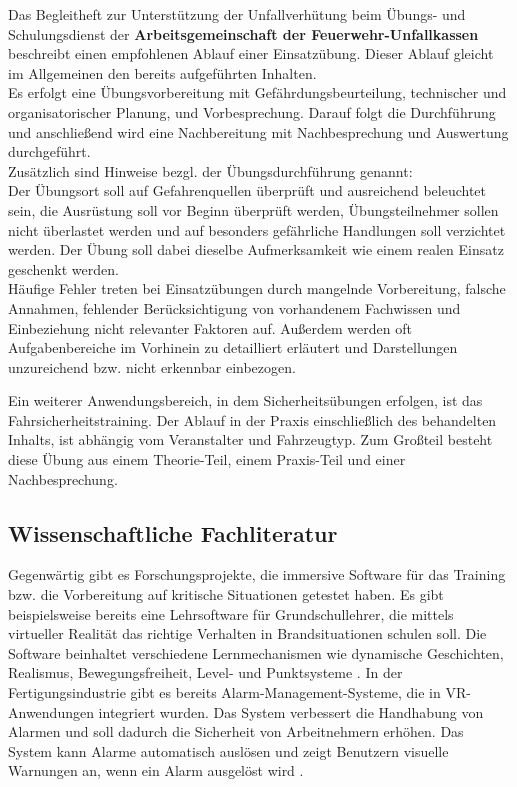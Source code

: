 Das Begleitheft zur Unterstützung der Unfallverhütung beim Übungs- und Schulungsdienst der \textbf{Arbeitsgemeinschaft der Feuerwehr-Unfallkassen} \autocite{Feuerweh-Unfallkasse} beschreibt einen empfohlenen Ablauf einer Einsatzübung. Dieser Ablauf gleicht im Allgemeinen den bereits aufgeführten Inhalten. \\
Es erfolgt eine Übungsvorbereitung mit Gefährdungsbeurteilung, technischer und organisatorischer Planung, und Vorbesprechung. Darauf folgt die Durchführung und anschließend wird eine Nachbereitung mit Nachbesprechung und Auswertung durchgeführt. \\ 
Zusätzlich sind Hinweise bezgl. der Übungsdurchführung genannt: \\
Der Übungsort soll auf Gefahrenquellen überprüft und ausreichend beleuchtet sein, die Ausrüstung soll vor Beginn überprüft werden, Übungsteilnehmer sollen nicht überlastet werden und auf besonders gefährliche Handlungen soll verzichtet werden. Der Übung soll dabei dieselbe Aufmerksamkeit wie einem realen Einsatz geschenkt werden. \\
Häufige Fehler treten bei Einsatzübungen durch mangelnde Vorbereitung, falsche Annahmen, fehlender Berücksichtigung von vorhandenem Fachwissen und Einbeziehung nicht relevanter Faktoren auf. Außerdem werden oft Aufgabenbereiche im Vorhinein zu detailliert erläutert und Darstellungen unzureichend bzw. nicht erkennbar einbezogen. \autocite{Feuerweh-Übungspräsentation}

Ein weiterer Anwendungsbereich, in dem Sicherheitsübungen erfolgen, ist das Fahrsicherheitstraining. Der Ablauf in der Praxis einschließlich des behandelten Inhalts, ist abhängig vom Veranstalter und Fahrzeugtyp. Zum Großteil besteht diese Übung aus einem Theorie-Teil, einem Praxis-Teil und einer Nachbesprechung. \autocite{DVR}

\newpage
\subsection{Wissenschaftliche Fachliteratur}
\label{chap:scientific_research}
Gegenwärtig gibt es Forschungsprojekte,  die immersive Software für das Training bzw. die Vorbereitung auf kritische Situationen getestet haben. Es gibt beispielsweise bereits eine Lehrsoftware für Grundschullehrer, die mittels virtueller Realität das richtige Verhalten in Brandsituationen schulen soll. Die Software beinhaltet verschiedene Lernmechanismen wie dynamische Geschichten, Realismus, Bewegungsfreiheit, Level- und Punktsysteme \autocite{DDE_of_VR}. In der Fertigungsindustrie gibt es bereits Alarm-Management-Systeme, die in VR-Anwendungen integriert wurden. Das System verbessert die Handhabung von Alarmen und soll dadurch die Sicherheit von Arbeitnehmern erhöhen. Das System kann Alarme automatisch auslösen und zeigt Benutzern visuelle Warnungen an, wenn ein Alarm ausgelöst wird \autocite{Design_of_VR-training}.

